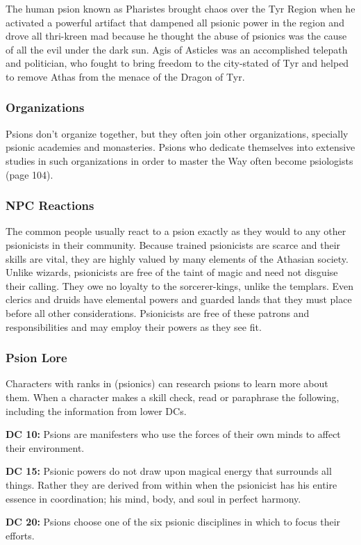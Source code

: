 The human psion known as Pharistes brought chaos over the Tyr Region when he activated a powerful artifact that dampened all psionic power in the region and drove all thri-kreen mad because he thought the abuse of psionics was the cause of all the evil under the dark sun. Agis of Asticles was an accomplished telepath and politician, who fought to bring freedom to the city-stated of Tyr and helped to remove Athas from the menace of the Dragon of Tyr.

\subsubsection{Organizations}

Psions don't organize together, but they often join other organizations, specially psionic academies and monasteries. Psions who dedicate themselves into extensive studies in such organizations in order to master the Way often become psiologists (page 104).

\subsubsection{NPC Reactions}

The common people usually react to a psion exactly as they would to any other psionicists in their community. Because trained psionicists are scarce and their skills are vital, they are highly valued by many elements of the Athasian society. Unlike wizards, psionicists are free of the taint of magic and need not disguise their calling. They owe no loyalty to the sorcerer-kings, unlike the templars. Even clerics and druids have elemental powers and guarded lands that they must place before all other considerations. Psionicists are free of these patrons and responsibilities and may employ their powers as they see fit.

\subsubsection{Psion Lore}

Characters with ranks in  (psionics) can research psions to learn more about them. When a character makes a skill check, read or paraphrase the following, including the information from lower DCs.

\textbf{DC 10:} Psions are manifesters who use the forces of their own minds to affect their environment.

\textbf{DC 15:} Psionic powers do not draw upon magical energy that surrounds all things. Rather they are derived from within when the psionicist has his entire essence in coordination; his mind, body, and soul in perfect harmony.

\textbf{DC 20:} Psions choose one of the six psionic disciplines in which to focus their efforts.
